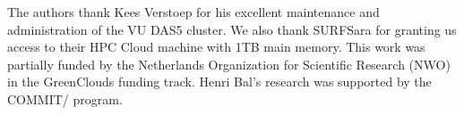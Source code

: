 The authors thank Kees Verstoep for his excellent maintenance
and administration of the VU DAS5 cluster. We also thank SURFSara for
granting us access to their HPC Cloud machine with 1TB main memory.
This work was partially funded by the Netherlands Organization for Scientific
Research (NWO) in the GreenClouds funding track. Henri Bal's research
was supported by the COMMIT/ program.
